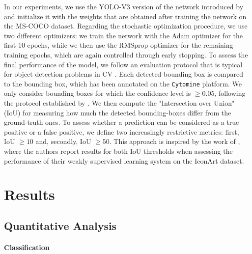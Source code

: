 In our experiments, we use the YOLO-V3 version of the network introduced by \citet{redmon2018yolov3} and initialize it with the weights that are obtained after training the network on the MS-COCO dataset. Regarding the stochastic optimization procedure, we use two different optimizers: we train the network with the Adam optimizer for the first 10 epochs, while we then use the RMSprop optimizer for the remaining training epochs, which are again controlled through early stopping. To assess the final performance of the model, we follow an evaluation protocol that is typical for object detection problems in CV \cite{lin2014microsoft}. Each detected bounding box is compared to the bounding box, which has been annotated on the \texttt{Cytomine} platform. We only consider bounding boxes for which the confidence level is $\geq 0.05$, following the protocol established by \citet{everingham2010pascal}. We then compute the "Intersection over Union" (IoU) for measuring how much the detected bounding-boxes differ from the ground-truth ones. To assess whether a prediction can be considered as a true positive or a false positive, we define two increasingly restrictive metrics: first, IoU $\geq10$ and, secondly, IoU $\geq50$. This approach is inspired by the work of \citet{gonthier2018weakly}, where the authors report results for both IoU thresholds when assessing the performance of their weakly supervised learning system on the IconArt dataset.

\section{Results}
\label{sec:minerva_results}

\subsection{Quantitative Analysis}
\label{sec:quantitative_analysis}
\paragraph{Classification}

